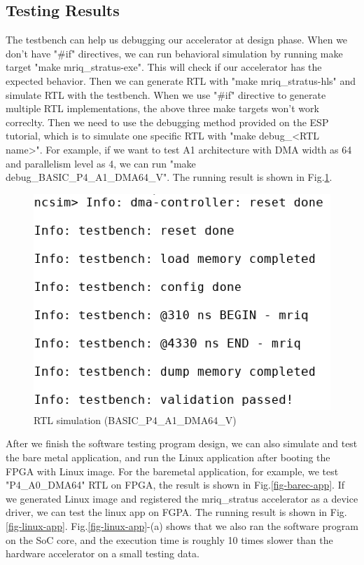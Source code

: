 \subsection{Testing Results}

The testbench can help us debugging our accelerator at design phase. When we
don't have "\#if" directives, we can run behavioral simulation by running make
target "make mriq\_stratus-exe". This will check if our accelerator has the
expected behavior. Then we can generate RTL with "make mriq\_stratus-hls" and
simulate RTL with the testbench. When we use "\#if" directive to generate
multiple RTL implementations, the above three make targets won't work
correclty. Then we need to use the debugging method provided on the ESP
tutorial, which is to simulate one specific RTL with "make debug\_<RTL
name>". For example, if we want to test A1 architecture with DMA width as 64 and
parallelism level as 4, we can run "make debug\_BASIC\_P4\_A1\_DMA64\_V". The
running result is shown in Fig.\ref{fig-3}.  \\

\begin{figure}[ht]
\centering
\captionsetup{justification=centering, format=hang}
\includegraphics[width=0.75\columnwidth]{figure/reverted-debug-sim-A1-4-4-2-2.png}
\caption{RTL simulation (BASIC\_P4\_A1\_DMA64\_V)}
\label{fig-3}
\end{figure}

After we finish the software testing program design, we can also simulate and
test the bare metal application, and run the Linux application after booting the
FPGA with Linux image. For the baremetal application, for example, we test
"P4\_A0\_DMA64" RTL on FPGA, the result is shown in Fig.\ref{fig-barec-app}. If
we generated Linux image and registered the mriq\_stratus accelerator as a
device driver, we can test the linux app on FGPA. The running result is shown in
Fig.\ref{fig-linux-app}. Fig.\ref{fig-linux-app}-(a) shows that we also ran the
software program on the SoC core, and the execution time is roughly 10 times
slower than the hardware accelerator on a small testing data.

